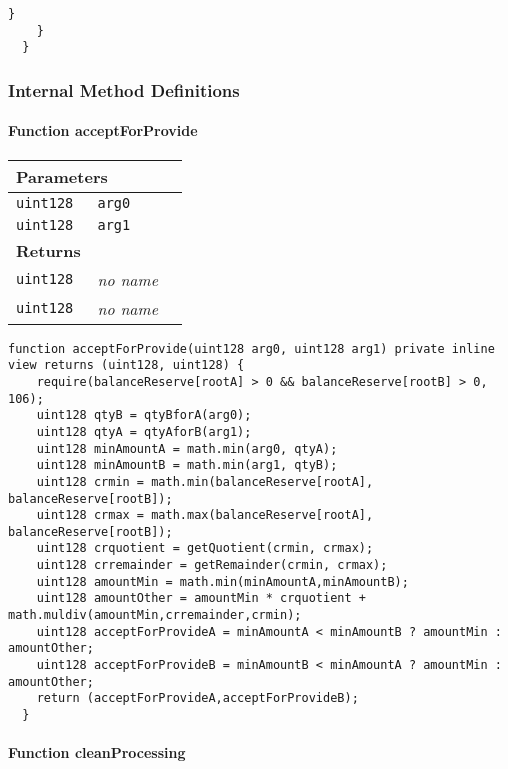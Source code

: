 \begin{lstlisting}[firstnumber=248]
      }
    }
  }
\end{lstlisting}

\subsubsection{Internal Method Definitions}


\paragraph{Function acceptForProvide}


\ifsoltables
\noindent\begin{tabular}{|l|l|p{5cm}|}\hline
\multicolumn{3}{|l|}{\bf Parameters}\\\hline
\tt uint128 & \tt arg0 &\\\hline
\tt uint128 & \tt arg1 &\\\hline
\multicolumn{3}{|l|}{\bf Returns}\\\hline
\tt uint128 & {\em no name} &\\\hline
\tt uint128 & {\em no name} &\\\hline
\end{tabular}
\fi

\vspace{2cm}

\begin{lstlisting}[firstnumber=214]
  function acceptForProvide(uint128 arg0, uint128 arg1) private inline view returns (uint128, uint128) {
    require(balanceReserve[rootA] > 0 && balanceReserve[rootB] > 0, 106);
    uint128 qtyB = qtyBforA(arg0);
    uint128 qtyA = qtyAforB(arg1);
    uint128 minAmountA = math.min(arg0, qtyA);
    uint128 minAmountB = math.min(arg1, qtyB);
    uint128 crmin = math.min(balanceReserve[rootA], balanceReserve[rootB]);
    uint128 crmax = math.max(balanceReserve[rootA], balanceReserve[rootB]);
    uint128 crquotient = getQuotient(crmin, crmax);
    uint128 crremainder = getRemainder(crmin, crmax);
    uint128 amountMin = math.min(minAmountA,minAmountB);
    uint128 amountOther = amountMin * crquotient + math.muldiv(amountMin,crremainder,crmin);
    uint128 acceptForProvideA = minAmountA < minAmountB ? amountMin : amountOther;
    uint128 acceptForProvideB = minAmountB < minAmountA ? amountMin : amountOther;
    return (acceptForProvideA,acceptForProvideB);
  }
\end{lstlisting}

\paragraph{Function cleanProcessing}


